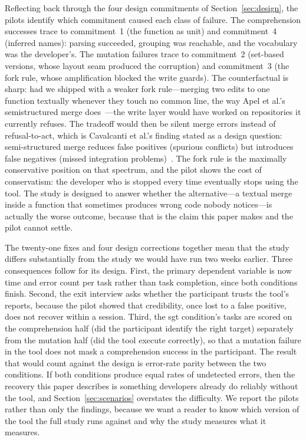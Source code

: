 Reflecting back through the four design commitments of Section~\ref{sec:design},
the pilots identify which commitment caused each class of failure. The
comprehension successes trace to commitment~1 (the function as unit) and
commitment~4 (inferred names): parsing succeeded, grouping was reachable, and
the vocabulary was the developer's. The mutation failures trace to commitment~2
(set-based versions, whose layout seam produced the corruption) and commitment~3
(the fork rule, whose amplification blocked the write guards). The
counterfactual is sharp: had we shipped with a weaker fork rule---merging two
edits to one function textually whenever they touch no common line, the way
Apel et al.'s semistructured merge does~\cite{apel2011}---the write layer would
have worked on repositories it currently refuses. The tradeoff would then be
silent merge errors instead of refusal-to-act, which is Cavalcanti et al.'s
finding stated as a design question: semi-structured merge reduces false
positives (spurious conflicts) but introduces false negatives (missed
integration problems)~\cite{cavalcanti2017}. The fork rule is the maximally
conservative position on that spectrum, and the pilot shows the cost of
conservatism: the developer who is stopped every time eventually stops using the
tool. The study is designed to answer whether the alternative---a textual merge
inside a function that sometimes produces wrong code nobody notices---is actually
the worse outcome, because that is the claim this paper makes and the pilot
cannot settle.

The twenty-one fixes and four design corrections together mean that the study
differs substantially from the study we would have run two weeks
earlier. Three consequences follow for its design. First, the primary dependent
variable is now time and error count per task rather than task completion, since
both conditions finish. Second, the exit interview asks whether the participant
trusts the tool's reports, because the pilot showed that credibility, once lost
to a false positive, does not recover within a session. Third, the sgt
condition's tasks are scored on the comprehension half (did the participant
identify the right target) separately from the mutation half (did the tool
execute correctly), so that a mutation failure in the tool does not mask a
comprehension success in the participant. The result that would count against the
design is error-rate parity between the two conditions. If both conditions
produce equal rates of undetected errors, then the recovery this paper describes
is something developers already do reliably without the tool, and
Section~\ref{sec:scenarios} overstates the difficulty. We
report the pilots rather than only the findings, because we want a reader to
know which version of the tool the full study runs against and why the study
measures what it measures.

